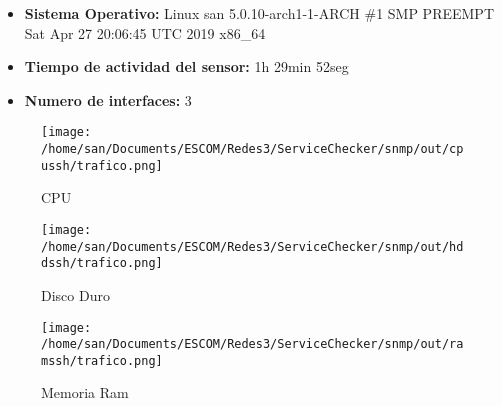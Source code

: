 \begin{itemize}
\item \textbf{Sistema Operativo:}  Linux san 5.0.10-arch1-1-ARCH \#1 SMP PREEMPT Sat Apr 27 20:06:45 UTC 2019 x86\_64
\item \textbf{Tiempo de actividad del sensor:} 1h 29min 52seg
\item \textbf{Numero de interfaces:} 3
\end{itemize}
\begin{figure}[!htb]
\texttt{[image: /home/san/Documents/ESCOM/Redes3/ServiceChecker/snmp/out/cpussh/trafico.png]}
\caption{CPU}\label{fig:awesome_image1}
\endminipage\hfill
{}
\texttt{[image: /home/san/Documents/ESCOM/Redes3/ServiceChecker/snmp/out/hddssh/trafico.png]}
\caption{Disco Duro}\label{fig:awesome_image2}
\endminipage\hfill
{}%
\texttt{[image: /home/san/Documents/ESCOM/Redes3/ServiceChecker/snmp/out/ramssh/trafico.png]}
\caption{Memoria Ram}\label{fig:awesome_image3}
\endminipage
\end{figure}
\FloatBarrier
